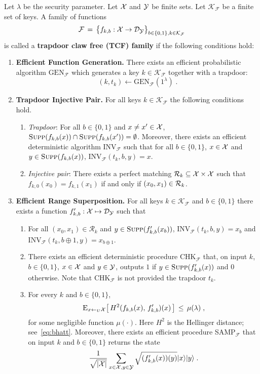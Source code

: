 \begin{definition}\label{def:trapdoorclawfree}
Let $\lambda$ be the security parameter. Let $\mathcal{X}$ and $\mathcal{Y}$ be finite sets.
 Let $\mathcal{K}_{\mathcal{F}}$ be a finite set of keys. A family of functions 
$$\mathcal{F} \,=\, \big\{f_{k,b} : \mathcal{X}\rightarrow \mathcal{D}_{\mathcal{Y}} \big\}_{b\in\{0,1\},k\in \mathcal{K}_{\mathcal{F}}}$$
is called a \textbf{trapdoor claw free (TCF) family} if the following conditions hold:

\begin{enumerate}
\item{\textbf{Efficient Function Generation.}} There exists an efficient probabilistic algorithm $\textrm{GEN}_{\mathcal{F}}$ which generates a key $k\in \mathcal{K}_{\mathcal{F}}$ together with a trapdoor: 
$$(k,t_k) \leftarrow \textrm{GEN}_{\mathcal{F}}(1^\lambda)\;.$$
\item{\textbf{Trapdoor Injective Pair.}} For all keys $k\in \mathcal{K}_{\mathcal{F}}$ the following conditions hold. 
\begin{enumerate}
\item \textit{Trapdoor}: For all $b\in\{0,1\}$ and $x\neq x' \in \mathcal{X}$, $\textsc{Supp}(f_{k,b}(x))\cap \textsc{Supp}(f_{k,b}(x')) = \emptyset$. Moreover, there exists an efficient deterministic algorithm $\textrm{INV}_{\mathcal{F}}$ such that for all $b\in \{0,1\}$,  $x\in \mathcal{X}$ and $y\in \textsc{Supp}(f_{k,b}(x))$, $\textrm{INV}_{\mathcal{F}}(t_k,b,y) = x$. 
\item \textit{Injective pair}: There exists a perfect matching $\mathcal{R}_k \subseteq \mathcal{X} \times \mathcal{X}$ such that $f_{k,0}(x_0) = f_{k,1}(x_1)$ if and only if $(x_0,x_1)\in \mathcal{R}_k$. \end{enumerate}

\item{\textbf{Efficient Range Superposition.}}
For all keys $k\in \mathcal{K}_{\mathcal{F}}$ and $b\in \{0,1\}$ there exists a function $f'_{k,b}:\mathcal{X}\mapsto \mathcal{D}_{\mathcal{Y}}$ such that
\begin{enumerate} 
\item For all $(x_0,x_1)\in \mathcal{R}_k$ and $y\in \textsc{Supp}(f'_{k,b}(x_b))$, INV$_{\mathcal{F}}(t_k,b,y) = x_b$ and INV$_{\mathcal{F}}(t_k,b\oplus 1,y) = x_{b\oplus 1}$. 
\item There exists an efficient deterministic procedure CHK$_{\mathcal{F}}$ that, on input $k$, $b\in \{0,1\}$, $x\in \mathcal{X}$ and $y\in \mathcal{Y}$, outputs $1$ if  $y\in \textsc{Supp}(f'_{k,b}(x))$ and $0$ otherwise. Note that CHK$_{\mathcal{F}}$ is not provided the trapdoor $t_k$. 
\item For every $k$ and $b\in\{0,1\}$, 
$$ \textsc{E}_{x\leftarrow_U \mathcal{X}} \big[\,H^2(f_{k,b}(x),\,f'_{k,b})(x)\,\big] \,\leq\, \mu(\lambda)\;,$$
 for some negligible function $\mu(\cdot)$. Here $H^2$ is the Hellinger distance; see~\eqref{eq:bhatt}. Moreover, there exists an efficient procedure  SAMP$_{\mathcal{F}}$ that on input $k$ and $b\in\{0,1\}$ returns the state
\begin{equation}
    \frac{1}{\sqrt{|\mathcal{X}|}}\sum_{x\in \mathcal{X},y\in \mathcal{Y}}\sqrt{(f'_{k,b}(x))(y)}|x\rangle|y\rangle\;.
\end{equation}



\end{enumerate}
\end{enumerate}
\end{definition}

